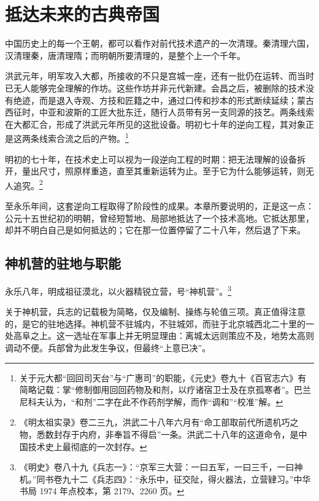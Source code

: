 \chapter{抵达未来的古典帝国}

\noindent
中国历史上的每一个王朝，都可以看作对前代技术遗产的一次清理。秦清理六国，汉清理秦，唐清理隋；而明朝所要清理的，是整个上一个千年。

洪武元年，明军攻入大都，所接收的不只是宫城一座，还有一批仍在运转、而当时已无人能够完全理解的作坊。这些作坊并非元代新建。会昌之后，被删除的技术没有绝迹，而是退入寺观、方技和匠籍之中，通过口传和抄本的形式断续延续；蒙古西征时，中亚和波斯的工匠大批东迁，随行人员带有另一支同源的技艺。两条线索在大都汇合，形成了洪武元年所见的这批设备。明初七十年的逆向工程，其对象正是这两条线索合流之后的产物。\footnote{关于元大都“回回司天台”与“广惠司”的职能，《元史》卷九十《百官志六》有简略记载：掌“修制御用回回药物及和剂，以疗诸宿卫士及在京孤寒者”。巴兰尼科夫认为，“和剂”二字在此不作药剂学解，而作“调和”“校准”解。}

明初的七十年，在技术史上可以视为一段逆向工程的时期：把无法理解的设备拆开，量出尺寸，照原样重造，直至其重新运转为止。至于它为什么能够运转，则无人追究。\footnote{《明太祖实录》卷二三九，洪武二十八年六月有“命工部取前代所遗机巧之物，悉数封存于内府，非奉旨不得启”一条。洪武二十八年的这道命令，是中国技术史上最彻底的一次封存。}

至永乐年间，这套逆向工程取得了阶段性的成果。本章所要说明的，正是这一点：公元十五世纪初的明朝，曾经短暂地、局部地抵达了一个技术高地。它抵达那里，却并不明白自己是如何抵达的；它在那一位置停留了二十八年，然后退了下来。

\section{神机营的驻地与职能}

永乐八年，明成祖征漠北，以火器精锐立营，号“神机营”。\footnote{《明史》卷八十九《兵志一》：“京军三大营：一曰五军，一曰三千，一曰神机。”同书卷九十二《兵志四》：“永乐中，征交阯，得火器法，立营肄习。”中华书局 1974 年点校本，第 2179、2260 页。}

关于神机营，兵志的记载极为简略，仅及编制、操练与轮值三项。真正值得注意的，是它的驻地选择。神机营不驻城内，不驻城郊，而驻于北京城西北二十里的一处高阜之上。这一选址在军事上并无明显理由：离城太远则策应不及，地势太高则调动不便。兵部曾为此发生争议，但最终“上意已决”。

